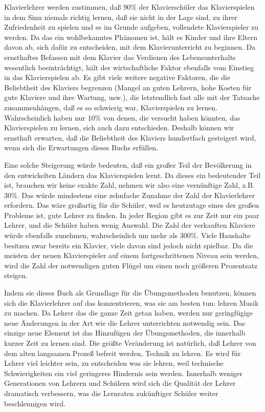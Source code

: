 Klavierlehrer werden zustimmen, daß 90\% der Klavierschüler das Klavierspielen in dem Sinn niemals richtig lernen, daß sie nicht in der Lage sind, zu ihrer Zufriedenheit zu spielen und es im Grunde aufgeben, vollendete Klavierspieler zu werden.
Da das ein wohlbekanntes Phänomen ist, hält es Kinder und ihre Eltern davon ab, sich dafür zu entscheiden, mit dem Klavierunterricht zu beginnen.
Da ernsthaftes Befassen mit dem Klavier das Verdienen des Lebensunterhalts wesentlich beeinträchtigt, hält der wirtschaftliche Faktor ebenfalls vom Einstieg in das Klavierspielen ab.
Es gibt viele weitere negative Faktoren, die die Beliebtheit des Klaviers begrenzen (Mangel an guten Lehrern, hohe Kosten für gute Klaviere und ihre Wartung, usw.),
die letztendlich fast alle mit der Tatsache zusammenhängen, daß es so schwierig war, Klavierspielen zu lernen.
Wahrscheinlich haben nur 10\% von denen, die versucht haben könnten, das Klavierspielen zu lernen, sich auch dazu entschieden.
Deshalb können wir ernsthaft erwarten, daß die Beliebtheit des Klaviers hundertfach gesteigert wird, wenn sich die Erwartungen dieses Buchs erfüllen.

Eine solche Steigerung würde bedeuten, daß ein großer Teil der Bevölkerung in den entwickelten Ländern das Klavierspielen lernt.
Da dieses ein bedeutender Teil ist, brauchen wir keine exakte Zahl, nehmen wir also eine vernünftige Zahl, z.B. 30\%.
Das würde mindestens eine zehnfache Zunahme der Zahl der Klavierlehrer erfordern.
Das wäre großartig für die Schüler, weil es heutzutage eines der großen Probleme ist, gute Lehrer zu finden.
In jeder Region gibt es zur Zeit nur ein paar Lehrer, und die Schüler haben wenig Auswahl.
Die Zahl der verkauften Klaviere würde ebenfalls zunehmen, wahrscheinlich um mehr als 300\%.
Viele Haushalte besitzen zwar bereits ein Klavier, viele davon sind jedoch nicht spielbar.
Da die meisten der neuen Klavierspieler auf einem fortgeschrittenen Niveau sein werden, wird die Zahl der notwendigen guten Flügel um einen noch größeren Prozentsatz steigen.

Indem sie dieses Buch als Grundlage für die Übungsmethoden benutzen, können sich die Klavierlehrer auf das konzentrieren, was sie am besten tun: lehren Musik zu machen.
Da Lehrer das die ganze Zeit getan haben, werden nur geringfügige neue Änderungen in der Art wie die Lehrer unterrichten notwendig sein.
Das einzige neue Element ist das Hinzufügen der Übungsmethoden, die innerhalb kurzer Zeit zu lernen sind.
Die größte Veränderung ist natürlich, daß Lehrer von dem alten langsamen Prozeß befreit werden, Technik zu lehren.
Es wird für Lehrer viel leichter sein, zu entscheiden was sie lehren, weil technische Schwierigkeiten ein viel geringeres Hindernis sein werden.
Innerhalb weniger Generationen von Lehrern und Schülern wird sich die Qualität der Lehrer dramatisch verbessern, was die Lernraten zukünftiger Schüler weiter beschleunigen wird.

